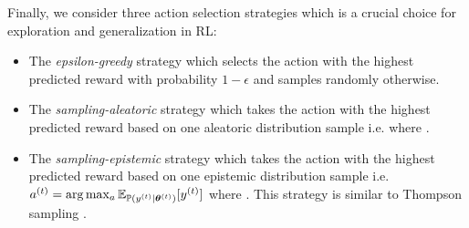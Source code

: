 Finally, we consider three action selection strategies which is a crucial choice for exploration and generalization in RL: 
\vspace{-2mm}
\begin{itemize}
    \item The \emph{epsilon-greedy} strategy \citep{epsilon-greedy} which selects the action with the highest predicted reward with probability $1-\epsilon$ and samples randomly otherwise.
    \item The \emph{sampling-aleatoric} strategy which takes the action with the highest predicted reward based on one aleatoric distribution sample i.e.  where \smash{$\y\datatx \sim \prob(\y\datatx | \expparam\datatx)$}.
    \item The \emph{sampling-epistemic} strategy which takes the action with the highest predicted reward based on one epistemic distribution sample i.e. $a^{(t)} = \arg\max_{a} \operatorname{\mathbb{E}}_{\operatorname{\mathbb{P}}(y^{(t)} | \bm{\theta}^{(t)})}[y^{(t)}]$ where \smash{$\expparam\datatx \sim \prior(\expparam\datatx | \priorparam\datatx)$}. This strategy is similar to Thompson sampling \citep{thompson-sampling}.
\end{itemize}
